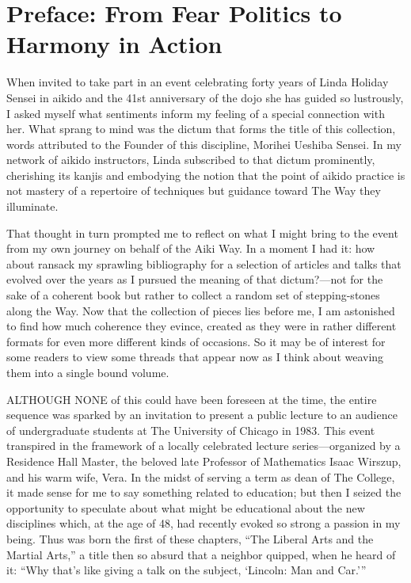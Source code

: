 \chapter[\hspace{1.5em}Preface: From Fear Politics to Harmony in Action]{Preface: From Fear Politics to Harmony in Action}

When invited to take part in an event celebrating forty years of Linda \hbox{Holiday} Sensei in aikido and the 41st anniversary of the dojo she has guided so lustrously, I asked myself what sentiments inform my feeling of a special connection with her. What sprang to mind was the dictum that forms the title of this collection, words attributed to the Founder of this discipline, Morihei Ueshiba Sensei. In my network of aikido instructors, Linda subscribed to that dictum prominently, cherishing its kanjis and embodying the notion that the point of aikido practice is not mastery of a repertoire of techniques but guidance toward The Way they illuminate.

That thought in turn prompted me to reflect on what I might bring to the event from my own journey on behalf of the Aiki Way. In a moment I had it: how about ransack my sprawling bibliography for a selection of articles and talks that evolved over the years as I pursued the meaning of that dictum?---not for the sake of a coherent book but rather to collect a random set of stepping-stones along the Way. Now that the collection of pieces lies before me, I am astonished to find how much coherence they evince, created as they were in rather different formats for even more different kinds of occasions. So it may be of interest for some readers to view some threads that appear now as I think about weaving them into a single bound volume.

\vspace{1.5em}

{\uppercase{Although none}} of this could have been foreseen at the time, the entire sequence was sparked by an invitation to present a public lecture to an audience of undergraduate students at The University of Chicago in 1983. This event transpired in the framework of a locally celebrated lecture series---organized by a Residence Hall Master, the beloved late Professor of Mathematics Isaac Wirszup, and his warm wife, Vera. In the midst of serving a term as dean of The College, it made sense for me to say something related to education; but then I seized the opportunity to speculate about what might be educational about the new disciplines which, at the age of 48, had recently evoked so strong a passion in my being.  Thus was born the first of these chapters, ``The Liberal Arts and the Martial Arts,'' a title then so absurd that a neighbor quipped, when he heard of it: ``Why that's like giving a talk on the subject, `Lincoln: Man and Car.'''

